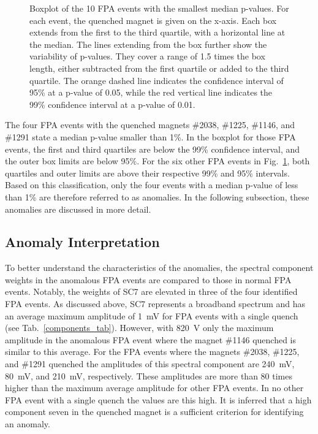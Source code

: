 \documentclass[lettersize,journal]{IEEEtran}
\begin{document}
\begin{figure}[h]
    \centering
    
    \caption{Boxplot of the 10 FPA events with the smallest median p-values. For each event, the quenched magnet is given on the x-axis.
    Each box extends from the first to the third quartile, with a horizontal line at the median. 
    The lines extending from the box further show the variability of p-values. They cover a range of 1.5 times the box length, either subtracted from the first quartile or added to the third quartile. 
    The orange dashed line indicates the confidence interval of 95\% at a p-value of 0.05, while the red vertical line indicates the 99\% confidence interval at a p-value of 0.01. }
    \label{boxplot}
\end{figure}

The four FPA events with the quenched magnets \#2038, \#1225, \#1146, and \#1291 state a median p-value smaller than 1\%.
In the boxplot for those FPA events, the first and third quartiles are below the 99\% confidence interval, and the outer box limits are below 95\%. 
For the six other FPA events in Fig.~\ref{boxplot}, both quartiles and outer limits are above their respective 99\% and 95\% intervals.
Based on this classification, only the four events with a median p-value of less than 1\% are therefore referred to as anomalies.
In the following subsection, these anomalies are discussed in more detail.

\subsection{Anomaly Interpretation}
To better understand the characteristics of the anomalies, the spectral component weights in the anomalous FPA events are compared to those in normal FPA events.
Notably, the weights of SC7 are elevated in three of the four identified FPA events.
As discussed above, SC7 represents a broadband spectrum and has an average maximum amplitude of 1~mV for FPA events with a single quench (see Tab.~\ref{components_tab}). 
However, with 820~\textmu V only the maximum amplitude in the anomalous FPA event where the magnet \#1146 quenched is similar to this average.
For the FPA events where the magnets \#2038, \#1225, and \#1291 quenched the amplitudes of this spectral component are 240~mV, 80~mV, and 210~mV, respectively. These amplitudes are more than 80 times higher than the maximum average amplitude for other FPA events. In no other FPA event with a single quench the values are this high.
It is inferred that a high component seven in the quenched magnet is a sufficient criterion for identifying an anomaly.
\end{document}
